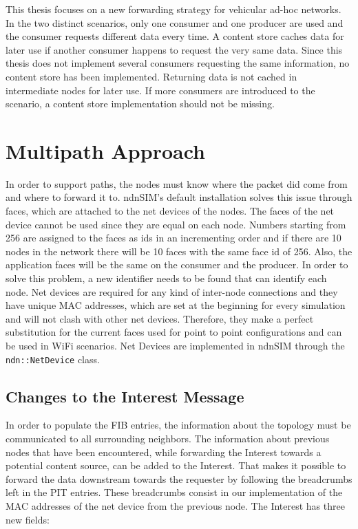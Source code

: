 This thesis focuses on a new forwarding strategy for vehicular ad-hoc networks. In the two distinct scenarios, only one consumer and one producer are used and the consumer requests different data every time. A content store caches data for later use if another consumer happens to request the very same data. Since this thesis does not implement several consumers requesting the same information, no content store has been implemented. Returning data is not cached in intermediate nodes for later use. If more consumers are introduced to the scenario, a content store implementation should not be missing.


\section{Multipath Approach}

In order to support paths, the nodes must know where the packet did come from and where to forward it to. ndnSIM's default installation solves this issue through faces, which are attached to the net devices of the nodes. The faces of the net device cannot be used since they are equal on each node. Numbers starting from 256 are assigned to the faces as ids in an incrementing order and if there are 10 nodes in the network there will be 10 faces with the same face id of 256. Also, the application faces will be the same on the consumer and the producer. In order to solve this problem, a new identifier needs to be found that can identify each node. Net devices are required for any kind of inter-node connections and they have unique MAC addresses, which are set at the beginning for every simulation and will not clash with other net devices. Therefore, they make a perfect substitution for the current faces used for point to point configurations and can be used in WiFi scenarios. Net Devices are implemented in ndnSIM through the \texttt{ndn::NetDevice} class.

\subsection{Changes to the Interest Message}

In order to populate the FIB entries, the information about the topology must be communicated to all surrounding neighbors. The information about previous nodes that have been encountered, while forwarding the Interest towards a potential content source, can be added to the Interest. That makes it possible to forward the data downstream towards the requester by following the breadcrumbs left in the PIT entries. These breadcrumbs consist in our implementation of the MAC addresses of the net device from the previous node. The Interest has three new fields:

